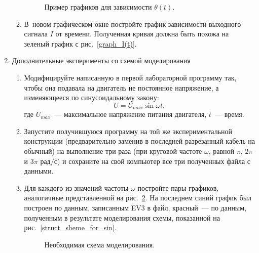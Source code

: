 \documentclass[12pt, a4paper, openany]{extarticle}
\begin{document}
\begin{enumerate}
\begin{enumerate}
\begin{figure}[h]
	\caption{Пример графиков для зависимости $\theta(t)$.}
	\label{second_graph}
\end{figure}
\item В~новом графическом окне постройте график зависимости выходного сигнала $I$ от времени. Полученная кривая должна быть похожа на зеленый график с рис.~\ref{graph_I(t)}.
\end{enumerate}
\item Дополнительные эксперименты со схемой моделирования
\begin{enumerate}
\item Модифицируйте написанную в первой лабораторной программу так, чтобы она подавала на двигатель не постоянное напряжение, а изменяющееся по синусоидальному закону:
\begin{equation}
	U = U_{max}\sin\omega t,
\end{equation}
где $U_{max}$~--- максимальное напряжение питания двигателя, $t$~--- время.
\item Запустите получившуюся программу на той же экспериментальной конструкции (предварительно заменив в последней разрезанный кабель на обычный) на выполнение три раза (при круговой частоте $\omega$, равной $\pi$, $2\pi$ и $3\pi\text{ рад/с}$) и сохраните на свой компьютер все три полученных файла с данными.
\item Для каждого из значений частоты $\omega$ постройте пары графиков, аналогичные представленной на рис.~\ref{graphs_when_sin}. На последнем синий график был построен по данным, записанным EV3 в файл, красный~--- по данным, полученным в результате моделирования схемы, показанной на рис.~\ref{struct_sheme_for_sin}.
\begin{figure}[h]
	\caption{Необходимая схема моделирования.}
	\label{graphs_when_sin}
\end{figure}
\end{enumerate}
\end{enumerate}
\end{document}
